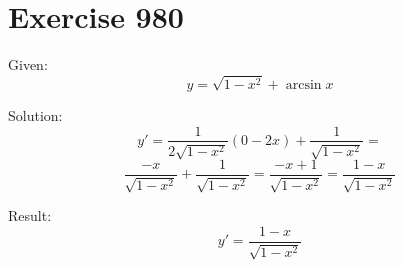 \documentclass[a4paper, 10pt]{scrartcl}
\begin{document}
\section{Exercise 980}

Given:
\[
y = \sqrt{1 - x^{2}} + \arcsin{x}
\]

Solution:
\[
y' = \frac{1}{2\sqrt{1 - x^{2}}}(0 - 2x) + \frac{1}{\sqrt{1 - x^{2}}} =
\]
\[
\frac{-x}{\sqrt{1 - x^{2}}} + \frac{1}{\sqrt{1 - x^{2}}} = \frac{-x + 1}{\sqrt{1 - x^{2}}} = \frac{1 - x}{\sqrt{1 - x^{2}}}
\]

Result:
\[
y' = \frac{1 - x}{\sqrt{1 - x^{2}}}
\]
\end{document}
